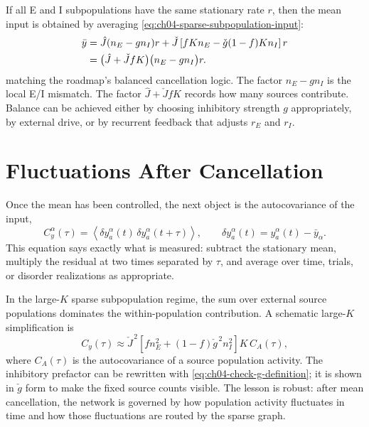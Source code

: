 If all E and I subpopulations have the same stationary rate $r$, then the mean
input is obtained by averaging \cref{eq:ch04-sparse-subpopulation-input}:
%
\begin{align}
  \bar y
  &=
  \hat J(n_E-g n_I)r
  +
  \check J\left[fK n_E-\check g(1-f)K n_I\right]r
  \notag\\
  &=
  \bigl(\hat J+\check J fK\bigr)
  \bigl(n_E-g n_I\bigr)r .
  \label{eq:ch04-roadmap-balanced-mean}
\end{align}
%
matching the roadmap's balanced cancellation logic. The factor
$n_E-g n_I$ is the local E/I mismatch. The factor
$\hat J+\check J fK$ records how many sources contribute. Balance can be
achieved either by choosing inhibitory strength $g$ appropriately, by external
drive, or by recurrent feedback that adjusts $r_E$ and $r_I$.

\section{Fluctuations After Cancellation}
\label{sec:fluctuations-after-cancellation}

Once the mean has been controlled, the next object is the autocovariance of the
input,
%
\begin{equation}
  C_y^\alpha(\tau)
  =
  \left\langle
    \delta y_a^\alpha(t)\,
    \delta y_a^\alpha(t+\tau)
  \right\rangle,
  \qquad
  \delta y_a^\alpha(t)=y_a^\alpha(t)-\bar y_\alpha .
  \label{eq:ch04-input-autocovariance}
\end{equation}
%
This equation says exactly what is measured: subtract the stationary mean,
multiply the residual at two times separated by $\tau$, and average over time,
trials, or disorder realizations as appropriate.

In the large-$K$ sparse subpopulation regime, the sum over external source
populations dominates the within-population contribution. A schematic
large-$K$ simplification is
%
\begin{equation}
  C_y(\tau)
  \approx
  \check J^{\,2}
  \left[
    f n_E^2 + (1-f)\check g^{\,2}n_I^2
  \right]
  K\,C_A(\tau),
  \label{eq:ch04-large-k-covariance}
\end{equation}
%
where $C_A(\tau)$ is the autocovariance of a source population activity. The
inhibitory prefactor can be rewritten with
\cref{eq:ch04-check-g-definition}; it is shown in $\check g$ form to make the
fixed source counts visible. The lesson is robust: after mean cancellation, the
network is governed by how population activity fluctuates in time and how those
fluctuations are routed by the sparse graph.

